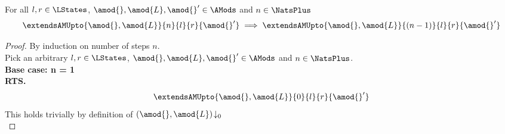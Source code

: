 \begin{lemma}[]\label{lem:future-closure}
For all $l, r \in \LStates$, $\amod{}, \amod{L}, \amod{}' \in \AMods$ and $n \in \NatsPlus$
%
\[
	\extendsAMUpto{\amod{}, \amod{L}}{n}{l}{r}{\amod{}'} \implies \extendsAMUpto{\amod{}, \amod{L}}{(n-1)}{l}{r}{\amod{}'}
\]
%
\begin{proof} By induction on number of steps $n$.\\
Pick an arbitrary $l, r \in \LStates$, $\amod{}, \amod{L}, \amod{}' \in \AMods$ and $n \in \NatsPlus$.\\
\textbf{Base case: n = 1}\\
\textbf{RTS.} 
%
\begin{equation}
	\extendsAMUpto{\amod{}, \amod{L}}{0}{l}{r}{\amod{}'} \nonumber
\end{equation}
%
This holds trivially by definition of $\left(\amod{}, \amod{L}\right)\!\downarrow_{0}$\\


\end{proof}
\end{lemma}

